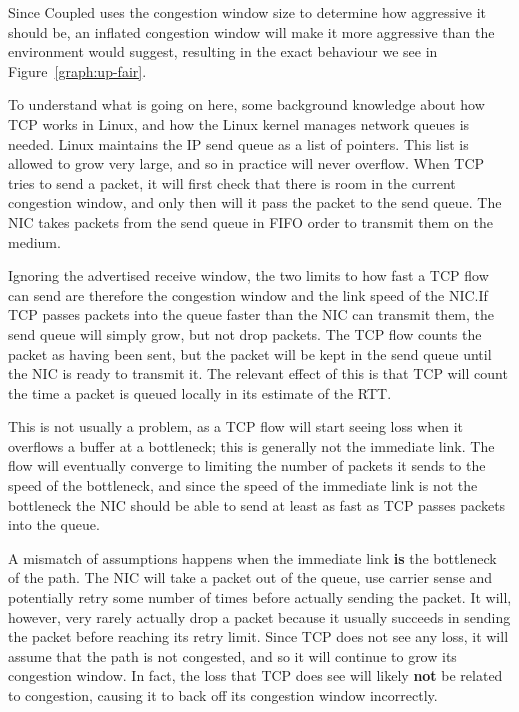 Since Coupled uses the congestion window size to determine how aggressive it
should be, an inflated congestion window will make it more aggressive than the 
environment would suggest, resulting in the exact behaviour we see in
Figure~\ref{graph:up-fair}.

To understand what is going on here, some background knowledge about how TCP
works in Linux, and how the Linux kernel manages network queues is needed. Linux
maintains the IP send queue as a list of pointers. This list is allowed to grow
very large, and so in practice will never overflow. When TCP tries to send a
packet, it will first check that there is room in the current congestion window,
and only then will it pass the packet to the send queue. The NIC takes packets 
from the send queue in FIFO order to transmit them on the medium.

Ignoring the advertised receive window, the two limits to how fast a TCP flow
can send are therefore the congestion window and the link speed of the NIC.\@ If
TCP passes packets into the queue faster than the NIC can transmit them, the
send queue will simply grow, but not drop packets. The TCP flow counts the
packet as having been sent, but the packet will be kept in the send queue until
the NIC is ready to transmit it. The relevant effect of this is that TCP will
count the time a packet is queued locally in its estimate of the RTT.

This is not usually a problem, as a TCP flow will start seeing loss when it
overflows a buffer at a bottleneck; this is generally not the immediate link.
The flow will eventually converge to limiting the number of packets it sends to
the speed of the bottleneck, and since the speed of the immediate link is not
the bottleneck the NIC should be able to send at least as fast as TCP passes
packets into the queue.

A mismatch of assumptions happens when the immediate link \textbf{is} the 
bottleneck of the path. The NIC will take a packet out of the queue, use carrier 
sense and potentially retry some number of times before actually sending the 
packet. It will, however, very rarely actually drop a packet because it usually 
succeeds in sending the packet before reaching its retry limit. Since TCP does 
not see any loss, it will assume that the path is not congested, and so it will 
continue to grow its congestion window.  In fact, the loss that TCP does see 
will likely \textbf{not} be related to congestion, causing it to back off its 
congestion window incorrectly. %

